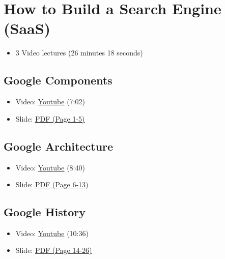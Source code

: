 \FILENAME

\section{How to Build a Search Engine
(SaaS)}\label{how-to-build-a-search-engine-saas}

\begin{itemize}
\item
  3 Video lectures (26 minutes 18 seconds)
\end{itemize}

\subsection{Google Components}\label{google-components}

\begin{itemize}
\item
  Video: \href{https://www.youtube.com/watch?v=IWMcv7HbbPM}{Youtube}
  (7:02)
\item
  Slide:
  \href{https://drive.google.com/open?id=0B88HKpainTSfYWZ0dDlrNThkVms}{PDF
  (Page 1-5)}
\end{itemize}

\subsection{Google Architecture}\label{google-architecture}

\begin{itemize}
\item
  Video: \href{https://www.youtube.com/watch?v=syZHezdbdRY}{Youtube}
  (8:40)
\item
  Slide:
  \href{https://drive.google.com/open?id=0B88HKpainTSfYWZ0dDlrNThkVms}{PDF
  (Page 6-13)}
\end{itemize}

\subsection{Google History}\label{google-history}

\begin{itemize}
\tightlist
\item
  Video: \href{https://www.youtube.com/watch?v=Kg0NK0XUkHw}{Youtube}
  (10:36)
\item
  Slide:
  \href{https://drive.google.com/open?id=0B88HKpainTSfYWZ0dDlrNThkVms}{PDF
  (Page 14-26)}
\end{itemize}
